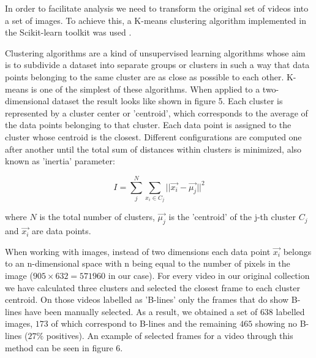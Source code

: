 \documentclass[11pt]{article} %
\begin{document}
	In order to facilitate analysis we need to transform the original set of videos into a set of images. To achieve this, a K-means clustering algorithm implemented in the Scikit-learn toolkit was used \cite{sklearn}. 
	
	Clustering algorithms are a kind of unsupervised learning algorithms whose aim is to subdivide a dataset into separate groups or clusters in such a way that data points belonging to the same cluster are as close as possible to each other. K-means is one of the simplest of these algorithms. When applied to a two-dimensional dataset the result looks like shown in figure 5\cite{python}. Each cluster is represented by a cluster center or 'centroid', which corresponds to the average of the data points belonging to that cluster. Each data point is assigned to the cluster whose centroid is the closest. Different configurations are computed one after another until the total sum of distances within clusters is minimized, also known as 'inertia' parameter:
	
	\[ I = \sum_j^N \sum_{x_i \in C_j} || \vec{x_i} - \vec{ \mu_j} ||^2 \]
	
	where $N$ is the total number of clusters, $\vec{\mu_j}$ is the 'centroid' of the j-th cluster $C_j$ and $\vec{x_i}$ are data points.
	
	When working with images, instead of two dimensions each data point $\vec{x_i}$ belongs to an n-dimensional space with n being equal to the number of pixels in the image ($905 \times 632=571960$ in our case). For every video in our original collection we have calculated three clusters and selected the closest frame to each cluster centroid. On those videos labelled as 'B-lines' only the frames that do show B-lines have been manually selected. As a result, we obtained a set of $638$ labelled images, $173$ of which correspond to B-lines and the remaining $465$ showing no B-lines ($27 \% $ positives). An example of selected frames for a video through this method can be seen in figure 6.
	
\end{document}
